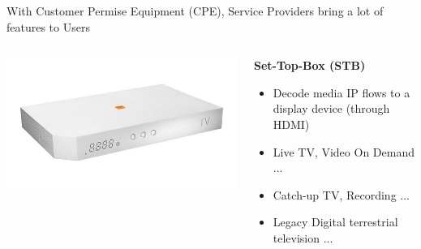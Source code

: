 \documentclass[a4paper]{beamer}
\begin{document}
\begin{frame}{With Customer Permise Equipment (CPE), Service Providers bring a lot of features to Users}
												
	\begin{columns}[T] 
		\begin{column}[T]{0.25 \textwidth} 
			\includegraphics[width=\linewidth]{liveboxdec.png}
		\end{column}
																										
		\begin{column}[T]{0.75 \textwidth} %
																																							
																																								   
			\textbf{ Set-Top-Box (STB)}
			\begin{itemize}
				\item Decode media IP flows to a display device (through HDMI)
				\item Live TV, Video On Demand ...
				\item Catch-up TV, Recording ...
				\item Legacy Digital terrestrial television ...
			\end{itemize}
																																								     
																																							
		\end{column}
																										
	\end{columns}
													
													
													
\end{frame}

\end{document}

